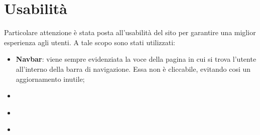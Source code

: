 \section{Usabilità}
Particolare attenzione è stata posta all'usabilità del sito per garantire una miglior esperienza agli utenti. A tale scopo sono stati utilizzati:
\begin{itemize}
	\item \textbf{Navbar}: viene sempre evidenziata la voce della pagina in cui si trova l'utente all'interno della barra di navigazione. Essa non è cliccabile, evitando cosi un aggiornamento inutile;
	\item \textbf{}
	\item \textbf{}
	\item \textbf{}
\end{itemize}


\newpage